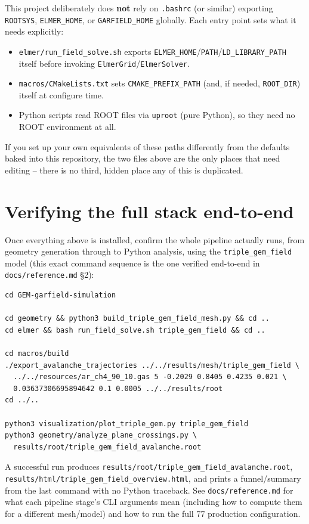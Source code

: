\documentclass[11pt]{article}
\begin{document}
This project deliberately does \textbf{not} rely on \texttt{.bashrc} (or
similar) exporting \texttt{ROOTSYS}, \texttt{ELMER\_HOME}, or
\texttt{GARFIELD\_HOME} globally. Each entry point sets what it needs
explicitly:

\begin{itemize}
  \item \texttt{elmer/run\_field\_solve.sh} exports
    \texttt{ELMER\_HOME}/\texttt{PATH}/\texttt{LD\_LIBRARY\_PATH} itself
    before invoking \texttt{ElmerGrid}/\texttt{ElmerSolver}.
  \item \texttt{macros/CMakeLists.txt} sets \texttt{CMAKE\_PREFIX\_PATH}
    (and, if needed, \texttt{ROOT\_DIR}) itself at configure time.
  \item Python scripts read ROOT files via \texttt{uproot} (pure Python),
    so they need no ROOT environment at all.
\end{itemize}

If you set up your own equivalents of these paths differently from the
defaults baked into this repository, the two files above are the only
places that need editing -- there is no third, hidden place any of this
is duplicated.

\section{Verifying the full stack end-to-end}

Once everything above is installed, confirm the whole pipeline actually
runs, from geometry generation through to Python analysis, using the
\texttt{triple\_gem\_field} model (this exact command sequence is the
one verified end-to-end in \texttt{docs/reference.md} \S2):

\begin{lstlisting}
cd GEM-garfield-simulation

cd geometry && python3 build_triple_gem_field_mesh.py && cd ..
cd elmer && bash run_field_solve.sh triple_gem_field && cd ..

cd macros/build
./export_avalanche_trajectories ../../results/mesh/triple_gem_field \
  ../../resources/ar_ch4_90_10.gas 5 -0.2029 0.8405 0.4235 0.021 \
  0.03637306695894642 0.1 0.0005 ../../results/root
cd ../..

python3 visualization/plot_triple_gem.py triple_gem_field
python3 geometry/analyze_plane_crossings.py \
  results/root/triple_gem_field_avalanche.root
\end{lstlisting}

A successful run produces
\texttt{results/root/triple\_gem\_field\_avalanche.root},
\texttt{results/html/triple\_gem\_field\_overview.html}, and prints a
funnel/summary from the last command with no Python traceback. See
\texttt{docs/reference.md} for what each pipeline stage's CLI arguments
mean (including how to compute them for a different mesh/model) and how
to run the full 7\texttimes{}7 production configuration.
\end{document}
